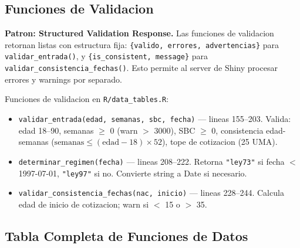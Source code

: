 \documentclass[11pt, letterpaper, twoside]{report}
\begin{document}
\subsection{Funciones de Validacion}

\begin{patronbox}
\textbf{Patron: Structured Validation Response.} Las funciones de validacion
retornan listas con estructura fija: \texttt{\{valido, errores, advertencias\}}
para \texttt{validar\_entrada()}, y \texttt{\{is\_consistent, message\}} para
\texttt{validar\_consistencia\_fechas()}. Esto permite al server de Shiny
procesar errores y warnings por separado.
\end{patronbox}

\begin{codigobox}
Funciones de validacion en \texttt{R/data\_tables.R}:
\begin{itemize}[nosep]
\item \texttt{validar\_entrada(edad, semanas, sbc, fecha)} --- lineas 155--203.
      Valida: edad 18--90, semanas $\geq$ 0 (warn $>$ 3000), SBC $\geq$ 0,
      consistencia edad-semanas ($\text{semanas} \leq (\text{edad}-18) \times 52$),
      tope de cotizacion (25 UMA).
\item \texttt{determinar\_regimen(fecha)} --- lineas 208--222.
      Retorna \texttt{"ley73"} si fecha $<$ 1997-07-01, \texttt{"ley97"} si no.
      Convierte string a Date si necesario.
\item \texttt{validar\_consistencia\_fechas(nac, inicio)} --- lineas 228--244.
      Calcula edad de inicio de cotizacion; warn si $<$ 15 o $>$ 35.
\end{itemize}
\end{codigobox}

\subsection{Tabla Completa de Funciones de Datos}
\end{document}
